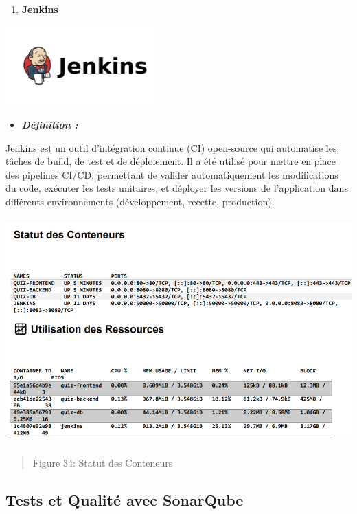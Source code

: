 \documentclass[12pt,a4paper,twoside]{report}
\begin{document}
\begin{enumerate}
\def\labelenumi{\Alph{enumi}.}
\setcounter{enumi}{1}
\item
  \textbf{Jenkins}
\end{enumerate}

\includegraphics[width=2.30833in,height=1.20625in]{latex_media/media/image39.png}

\begin{itemize}
\item
  \emph{\textbf{Définition :}}
\end{itemize}

Jenkins est un outil d'intégration continue (CI) open-source qui
automatise les tâches de build, de test et de déploiement. Il a été
utilisé pour mettre en place des pipelines CI/CD, permettant de valider
automatiquement les modifications du code, exécuter les tests unitaires,
et déployer les versions de l'application dans différents environnements
(développement, recette, production).

\includegraphics[width=5.45021in,height=3.41359in]{latex_media/media/image40.png}

\begin{quote}
Figure 34: Statut des Conteneurs
\end{quote}

\hypertarget{tests-et-qualituxe9-avec-sonarqube}{%
\subsection{Tests et Qualité avec
SonarQube}\label{tests-et-qualituxe9-avec-sonarqube}}
\end{document}
